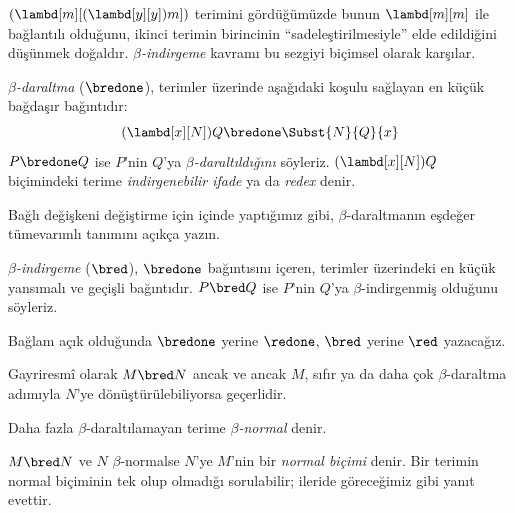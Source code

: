 


$(\lambd[m][(\lambd[y][y]) m])$ terimini gördüğümüzde bunun
$\lambd[m][m]$ ile bağlantılı olduğunu, ikinci terimin birincinin
``sadeleştirilmesiyle'' elde edildiğini düşünmek doğaldır.
\emph{$\beta$-indirgeme} kavramı bu sezgiyi biçimsel olarak karşılar.

\begin{defn} 
  \emph{$\beta$-daraltma} ($\bredone$), terimler üzerinde aşağıdaki koşulu
  sağlayan en küçük bağdaşır bağıntıdır:
  \[
    (\lambd[x][N])Q \bredone \Subst{N}{Q}{x}
  \]
  $P\bredone Q$ ise $P$'nin $Q$'ya \emph{$\beta$-daraltıldığını} söyleriz.
  $(\lambd[x][N])Q$ biçimindeki terime \emph{indirgenebilir ifade} ya da
  \emph{redex} denir.
\end{defn}

\begin{prob} 
  Bağlı değişkeni değiştirme için
   içinde yaptığımız gibi,
  $\beta$-daraltmanın eşdeğer tümevarımlı tanımını açıkça yazın.
\end{prob}

\begin{defn} 
  \emph{$\beta$-indirgeme} ($\bred$), $\bredone$ bağıntısını içeren,
  terimler üzerindeki en küçük yansımalı ve geçişli bağıntıdır. $P\bred Q$
  ise $P$'nin $Q$'ya $\beta$-indirgenmiş olduğunu söyleriz.
\end{defn}

Bağlam açık olduğunda $\bredone$ yerine $\redone$, $\bred$ yerine $\red$
yazacağız.

Gayriresmî olarak $M\bred N$ ancak ve ancak $M$, sıfır ya da daha çok
$\beta$-daraltma adımıyla $N$'ye dönüştürülebiliyorsa geçerlidir.

\begin{defn}
Daha fazla $\beta$-daraltılamayan terime \emph{$\beta$-normal} denir.
\end{defn}

$M\bred N$ ve $N$ $\beta$-normalse $N$'ye $M$'nin bir \emph{normal biçimi}
denir. Bir terimin normal biçiminin tek olup olmadığı sorulabilir; ileride
göreceğimiz gibi yanıt evettir.

